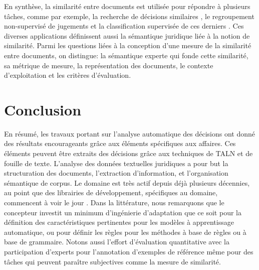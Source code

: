 En synthèse, la similarité entre documents est utilisée pour répondre à plusieurs tâches, comme par exemple, la recherche de décisions similaires \citep{thenmozhi2017legalprecedretriev}, le regroupement non-supervisé de jugements \citep{raghuveer2012legalclusteringLDA} et la classification supervisée de ces derniers \citep{ma2018wmdchinesecase}. Ces diverses applications définissent aussi la sémantique juridique liée à la notion de similarité. Parmi les questions liées à la conception d'une mesure de la similarité entre documents, on distingue: la sémantique experte qui fonde cette similarité, sa métrique de mesure, la représentation des documents, le contexte d'exploitation et les critères d'évaluation. %

\section{Conclusion}
\label{sec:literature:conclusion}
En résumé, les travaux portant sur l'analyse automatique des décisions ont donné des résultats encourageants grâce aux éléments spécifiques aux affaires. Ces éléments peuvent être extraits des décisions grâce aux techniques de TALN et de fouille de texte.  L'analyse des données textuelles juridiques a pour but la structuration des documents, l'extraction d'information, et l'organisation sémantique de corpus. Le domaine est très actif depuis déjà plusieurs décennies, au point que des librairies de développement, spécifiques au domaine, commencent à voir le jour \citep{bommarito2018lexnlp}. Dans la littérature, nous remarquons que le concepteur investit un minimum d'ingénierie d'adaptation que ce soit pour la définition des caractéristiques pertinentes pour les modèles à apprentissage automatique, ou pour définir les règles pour les méthodes à base de règles ou à base de grammaire. Notons aussi l'effort d'évaluation quantitative avec la participation d'experts pour l'annotation d'exemples de référence même pour des tâches qui peuvent paraître subjectives comme la mesure de similarité.



